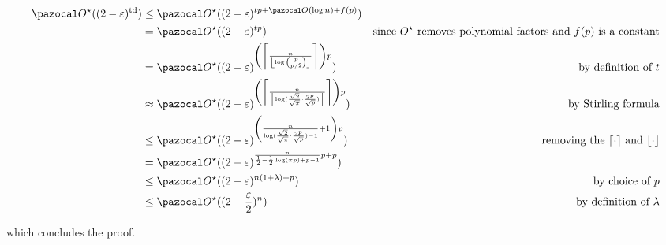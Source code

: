 \begin{align*}
    \O^\star((2-\varepsilon)^\td) &\leq \O^\star((2-\varepsilon)^{tp + \O(\log n) + f(p)})\\
    &= \O^\star((2-\varepsilon)^{tp}) & \text{since $O^\star$ removes polynomial factors and $f(p)$ is a constant}\\
    &= \O^\star((2-\varepsilon)^{\left(\left\lceil\frac{n}{\left\lfloor\log\binom{p}{p/2}\right\rfloor}\right\rceil\right) p}) & \text{by definition of $t$}\\
    &\approx \O^\star((2-\varepsilon)^{\left(\left\lceil\frac{n}{\left\lfloor\log(\frac{\sqrt{2}}{\sqrt{\pi}}\cdot\frac{2^p}{\sqrt{p}})\right\rfloor}\right\rceil\right) p}) & \text{by Stirling formula}\\
    &\leq \O^\star((2-\varepsilon)^{\left(\frac{n}{\log(\frac{\sqrt{2}}{\sqrt{\pi}}\cdot\frac{2^p}{\sqrt{p}}) - 1} + 1\right)p}) & \text{removing the $\lceil\cdot\rceil$ and $\lfloor\cdot\rfloor$}\\
    &= \O^\star((2-\varepsilon)^{\frac{n}{\frac{1}{2} - \frac{1}{2}\log(\pi p) + p - 1} p + p})\\
    &\leq \O^\star((2-\varepsilon)^{n(1+\lambda) + p}) & \text{by choice of $p$}\\
    &\leq \O^\star((2-\frac{\varepsilon}{2})^{n}) & \text{by definition of $\lambda$}
\end{align*}

which concludes the proof.